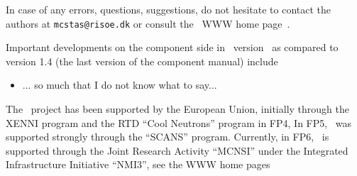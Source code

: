 In case of any errors, questions, suggestions, 
do not hesitate to 
contact the authors at \verb+mcstas@risoe.dk+
or consult the \MCS\ WWW home page~\cite{mcstas_webpage}.

Important developments on the component side in \MCS\ version \version\ 
as compared to version 1.4 (the last version of the component manual) include

\begin{itemize}
\item ... so much that I do not know what to say...
\end{itemize} 

The \MCS\ project has been supported by the European Union, initially
through the XENNI program and the RTD ``Cool Neutrons'' program in FP4,
In FP5, \MCS\ was supported strongly through the
``SCANS'' program. 
Currently, in FP6, \MCS\ is supported through the Joint Research Activity
``MCNSI'' under the Integrated Infrastructure Initiative ``NMI3'', see
the WWW home pages~\cite{mcnsi_webpage,nmi3_webpage}






